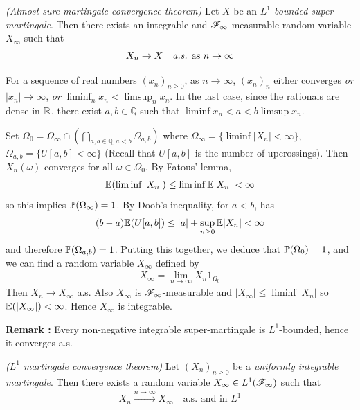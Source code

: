 \documentclass[10pt,a4paper]{report}
\newenvironment{proof}
{\begin{changemargin}{1cm}{0.5cm} 
	}%
	{\end{changemargin}
}
\begin{document}
\emph{(Almost sure martingale convergence theorem)} Let $X$ be an \emph{$L^1$-bounded super-martingale}. Then there exists an integrable and $\mathscr{F}_{\infty}$-measurable random variable $X_{\infty}$ such that
\begin{align*}
X_n \rightarrow X \quad \text{\emph{a.s.} as } n\rightarrow \infty
\end{align*}
\begin{proof}
\pf For a sequence of real numbers $(x_n)_{n\geq 0}$, as $n\rightarrow \infty$, $(x_n)_n$ either converges \emph{or} $|x_n|\rightarrow \infty$, \emph{or} $\liminf_{n} x_n < \limsup_{n} x_n$. In the last case, since the rationals are dense in $\mathbb{R}$, there exist $a,b\in \mathbb{Q}$ such that $\liminf x_n < a<b \limsup x_n$. 

\quad Set $\Omega_0 = \Omega_{\infty} \cap (\bigcap_{a,b\in \mathbb{Q},a<b} \Omega_{a,b})$ where $\Omega_{\infty} = \{ \liminf |X_n| <\infty \}$, $\Omega_{a,b} = \{ U[a,b] < \infty \}$ (Recall that $U[a,b]$ is the number of upcrossings). Then $X_n(\omega)$ converges for all $\omega \in \Omega_0$. By Fatous' lemma,
\begin{align*}
\mathbb{E}(\liminf |X_n|) \leq \liminf \mathbb{E} |X_n| <\infty
\end{align*}
so this implies $\mathbb{P} (\Omega_{\infty}) =1$. By Doob's inequality, for $a<b$, has
\begin{align*}
(b-a) \mathbb{E}(U[a,b]) \leq |a| + \sup_{n\geq 0} \mathbb{E} |X_n | <\infty
\end{align*}
and therefore $\mathbb{P}(\Omega_{a,b})=1$. Putting this together, we deduce that $\mathbb{P}(\Omega_0) =1$, and we can find a random variable $X_{\infty}$ defined by
\begin{align*}
X_{\infty} = \lim_{n\rightarrow \infty} X_n 1_{\Omega_0}
\end{align*}
Then $X_n\rightarrow X_{\infty}$ a.s. Also $X_{\infty}$ is $\mathscr{F}_{\infty}$-measurable and $|X_{\infty}| \leq \liminf|X_n|$ so $\mathbb{E}(|X_{\infty}|) <\infty$. Hence $X_{\infty}$ is integrable.

\eop
\end{proof}
\s

\textbf{Remark :} Every non-negative integrable super-martingale is $L^1$-bounded, hence it converges a.s.
\s

\emph{($L^1$ martingale convergence theorem)} Let $(X_n)_{n\geq 0}$ be a \emph{uniformly integrable martingale}. Then there exists a random variable $X_{\infty} \in L^1(\mathscr{F}_{\infty})$ such that
\begin{align*}
X_n \xrightarrow{n\rightarrow \infty} X_{\infty} \quad \text{a.s. and in }L^1
\end{align*}
\end{document}
